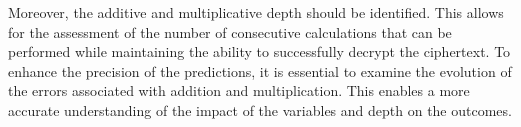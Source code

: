 Moreover, the additive and multiplicative depth should be identified. This allows for the assessment of the number of consecutive calculations that can be performed while maintaining the ability to successfully decrypt the ciphertext. To enhance the precision of the predictions, it is essential to examine the evolution of the errors associated with addition and multiplication. This enables a more accurate understanding of the impact of the variables and depth on the outcomes.
